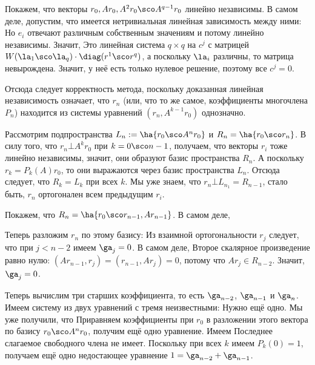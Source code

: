 \documentclass[a4paper]{article}
\begin{document}
Покажем, что векторы $r_0, Ar_0, A^2r_0\sco A^{q-1} r_0$ линейно
независимы. В самом деле, допустим, что имеется нетривиальная линейная
зависимость между ними:   Но $e_i$ отвечают
различным собственным значениям и потому линейно независимы. Значит,
  Это
линейная система $q\times q$ на $c^j$ с матрицей $W(\la_1\sco
\la_q)\cdot \diag(r^1\sco r^q)$, а поскольку $\la_i$ различны, то
матрица невырождена. Значит, у неё есть только нулевое решение,
поэтому все $c^j = 0$.

Отсюда следует корректность метода, поскольку доказанная линейная
независимость означает, что $r_n$ (или, что то же самое, коэффициенты
многочлена $P_n$) находится из системы уравнений $(r_n,A^{k-1} r_0)$
однозначно.

Рассмотрим подпространства $L_n := \ha{r_0\sco A^n r_0}$ и $R_n =
\ha{r_0\sco r_n}$.  В силу того, что $r_n \bot A^k r_0$ при $k = 0\sco
n-1$, получаем, что векторы $r_i$ тоже линейно независимы, значит, они
образуют базис пространства $R_n$.  А поскольку $r_k = P_k(A) r_0$, то
они выражаются через базис пространства $L_n$.  Отсюда следует, что
$R_k = L_k$ при всех $k$. Мы уже знаем, что $r_n \bot L_{n_1} =
R_{n-1}$, стало быть, $r_n$ ортогонален всем предыдущим $r_i$.

Покажем, что $R_n = \ha{r_0\sco r_{n-1}, A r_{n-1}}$. В самом деле,

Теперь разложим $r_n$ по этому базису:   Из взаимной ортогональности $r_j$
следует, что при $j < n-2$ имеем $\ga_j =0$.  В самом деле,   Второе
скалярное произведение равно нулю: $(A r_{n-1}, r_j) = (r_{n-1}, A
r_j) = 0$, потому что $A r_j \in R_{n-2}$. Значит, $\ga_j = 0$.

Теперь вычислим три старших коэффициента, то есть $\ga_{n-2}$,
$\ga_{n-1}$ и $\ga_n$.  Имеем систему из двух уравнений с тремя
неизвестными: 
Нужно ещё одно. Мы уже получили, что   Приравняем коэффициенты при
$r_0$ в разложении этого вектора по базису $r_0\sco A^n r_0$, получим
ещё одно уравнение. Имеем   Последнее
слагаемое свободного члена не имеет. Поскольку при всех $k$ имеем
$P_k(0) = 1$, получаем ещё одно недостающее уравнение $1 = \ga_{n-2} +
\ga_{n-1}$.
\end{document}
